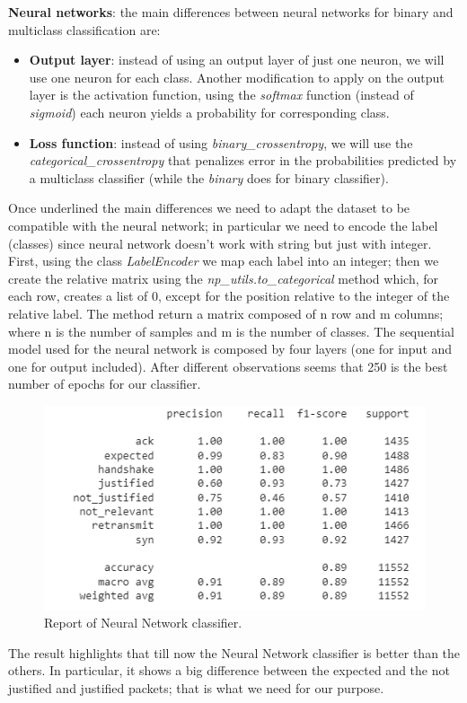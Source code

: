 \documentclass[sigconf]{acmart}
\begin{document}
    \textbf{Neural networks}: the main differences between neural networks for binary and multiclass classification are:
    \begin{itemize}
        \item \textbf{Output layer}: instead of using an output layer of just one neuron, we will use one neuron for each class. Another modification to apply on the output layer is the activation function, using the \textit{softmax} function (instead of \textit{sigmoid}) each neuron yields a probability for corresponding class.
        \item \textbf{Loss function}: instead of using \textit{binary\_crossentropy}, we will use the \textit{categorical\_crossentropy} that penalizes error in the probabilities predicted by a multiclass classifier (while the \textit{binary} does for binary classifier).
    \end{itemize}
    Once underlined the main differences we need to adapt the dataset to be compatible with the neural network; in particular we need to encode the label (classes) since neural network doesn't work with string but just with integer. First, using the class \textit{LabelEncoder} we map each label into an integer; then we create the relative matrix using the \textit{np\_utils.to\_categorical} method which, for each row, creates a list of 0, except for the position relative to the integer of the relative label. The method return a matrix composed of n row and m columns; where n is the number of samples and m is the number of classes.
    The sequential model used for the neural network is composed by four layers (one for input and one for output included). After different observations seems that 250 is the best number of epochs for our classifier.
    \begin{figure}[h!]
        \includegraphics[width=\linewidth]{img/nn_classifier.png}
        \caption{Report of Neural Network classifier.}
        \label{fig:nn_classifier}
    \end{figure}
    The result highlights that till now the Neural Network classifier is better than the others. In particular, it shows a big difference between the expected and the not justified and justified packets; that is what we need for our purpose.
\end{document}
